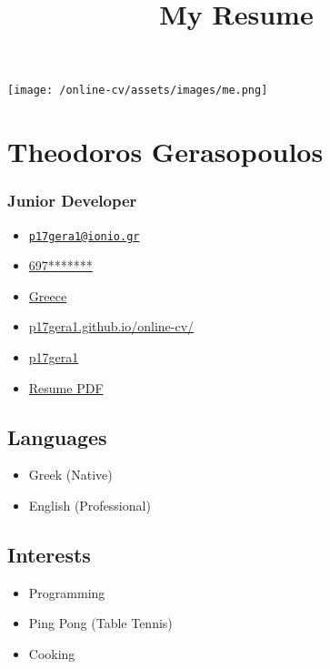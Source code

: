 \documentclass[
]{article}
\title{My Resume}
\author{}
\date{}
\providecommand{\tightlist}{%
  \setlength{\itemsep}{0pt}\setlength{\parskip}{0pt}}
\begin{document}
\maketitle

\texttt{[image: /online-cv/assets/images/me.png]}

\hypertarget{theodoros-gerasopoulos}{%
\section{Theodoros Gerasopoulos}\label{theodoros-gerasopoulos}}

\hypertarget{junior-developer}{%
\subsubsection{Junior Developer}\label{junior-developer}}

\begin{itemize}
\tightlist
\item
  \emph{} \href{mailto:p17gera1@ionio.gr}{\nolinkurl{p17gera1@ionio.gr}}
\item
  \emph{} \href{tel:697*******}{697*******}
\item
  \emph{} \href{}{Greece}
\item
  \emph{}
  \href{http://p17gera1.github.io/online-cv/}{p17gera1.github.io/online-cv/}
\item
  \emph{} \href{http://github.com/p17gera1}{p17gera1}
\item
  \emph{} \href{./pdf/cv.pdf}{Resume PDF}
\end{itemize}

\hypertarget{languages}{%
\subsection{Languages}\label{languages}}

\begin{itemize}
\tightlist
\item
  Greek {(Native)}
\item
  English {(Professional)}
\end{itemize}

\hypertarget{interests}{%
\subsection{Interests}\label{interests}}

\begin{itemize}
\tightlist
\item
  Programming
\item
  Ping Pong (Table Tennis)
\item
  Cooking
\end{itemize}
\end{document}
